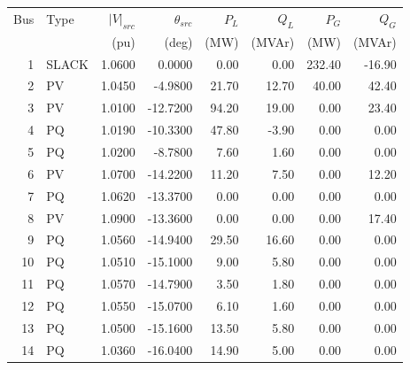 \begin{tabular}{r l r r r r r r}\toprule
Bus & Type & {$|V|_{src}$} & {$\theta_{src}$} & {$P_L$} & {$Q_L$} & {$P_G$} & {$Q_G$} \\
{} & {} & {(pu)} & {(deg)} & {(MW)} & {(MVAr)} & {(MW)} & {(MVAr)} \\ \midrule
1 & SLACK & 1.0600 & 0.0000 & 0.00 & 0.00 & 232.40 & -16.90 \\
2 & PV & 1.0450 & -4.9800 & 21.70 & 12.70 & 40.00 & 42.40 \\
3 & PV & 1.0100 & -12.7200 & 94.20 & 19.00 & 0.00 & 23.40 \\
4 & PQ & 1.0190 & -10.3300 & 47.80 & -3.90 & 0.00 & 0.00 \\
5 & PQ & 1.0200 & -8.7800 & 7.60 & 1.60 & 0.00 & 0.00 \\
6 & PV & 1.0700 & -14.2200 & 11.20 & 7.50 & 0.00 & 12.20 \\
7 & PQ & 1.0620 & -13.3700 & 0.00 & 0.00 & 0.00 & 0.00 \\
8 & PV & 1.0900 & -13.3600 & 0.00 & 0.00 & 0.00 & 17.40 \\
9 & PQ & 1.0560 & -14.9400 & 29.50 & 16.60 & 0.00 & 0.00 \\
10 & PQ & 1.0510 & -15.1000 & 9.00 & 5.80 & 0.00 & 0.00 \\
11 & PQ & 1.0570 & -14.7900 & 3.50 & 1.80 & 0.00 & 0.00 \\
12 & PQ & 1.0550 & -15.0700 & 6.10 & 1.60 & 0.00 & 0.00 \\
13 & PQ & 1.0500 & -15.1600 & 13.50 & 5.80 & 0.00 & 0.00 \\
14 & PQ & 1.0360 & -16.0400 & 14.90 & 5.00 & 0.00 & 0.00 \\
\bottomrule\end{tabular}
